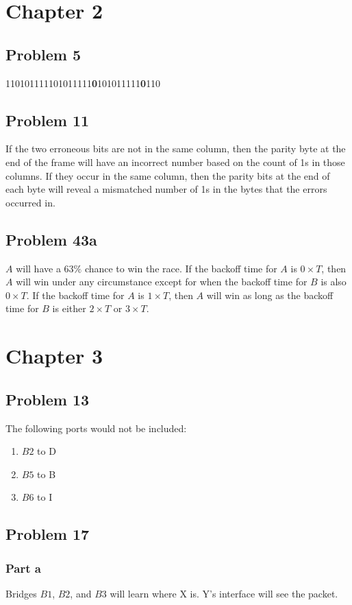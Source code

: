 \documentclass{article}%
\begin{document}
\section*{Chapter 2}
\subsection*{Problem 5}
110101111101011111\textbf{0}101011111\textbf{0}110


\subsection*{Problem 11}
If the two erroneous bits are not in the same column, then the parity byte at the end of the frame will
have an incorrect number based on the count of 1s in those columns. If they occur in the same column,
then the parity bits at the end of each byte will reveal a mismatched number of 1s in the bytes that the
errors occurred in.


\subsection*{Problem 43a}
$A$ will have a $63\%$ chance to win the race. If the backoff time for $A$ is $0 \times T$, then $A$ will win under
any circumstance except for when the backoff time for $B$ is also $0 \times T$. If the backoff time for $A$ is $1 \times T$,
then $A$ will win as long as the backoff time for $B$ is either $2 \times T$ or $3 \times T$.


\section*{Chapter 3}
\subsection*{Problem 13}
The following ports would not be included:
\begin{enumerate}
    \item $B2$ to D
    \item $B5$ to B
    \item $B6$ to I
\end{enumerate}


\subsection*{Problem 17}

\subsubsection*{Part a}
Bridges $B1$, $B2$, and $B3$ will learn where X is. Y's interface will see the packet.
\end{document}
